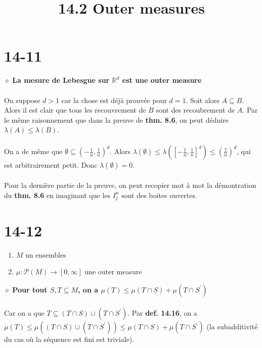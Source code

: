 \documentclass[a4paper,10pt]{article}
\title{14.2 Outer measures}
\begin{document}
\maketitle

\section*{14-11}
$\diamond$ \textbf{La mesure de Lebesgue sur $\mathbb{R}^d$ est une outer measure}
\\
\\
On suppose $d > 1$ car la chose est déjà prouvée pour $d = 1$. Soit alors $A \subseteq B$. Alors il est clair que tous les recouvrement de $B$ sont des recoubrement de $A$. Par le même raisonnement que dans la preuve de \textbf{thm. 8.6}, on peut déduire $\lambda (A) \leq \lambda (B)$.
\\
\\
On a de même que $\emptyset \subseteq (-\frac{1}{n}, \frac{1}{n})^d$. Alors $\lambda (\emptyset) \leq \lambda ([-\frac{1}{n}, \frac{1}{n}]^d)\leq (\frac{2}{n})^d$, qui est arbitrairement petit. Donc $\lambda(\emptyset) = 0$.
\\
\\
Pour la dernière partie de la preuve, on peut recopier mot à mot la démontration du \textbf{thm. 8.6} en imaginant que les $I_j^n$ sont des boites ouvertes.

\section*{14-12}
\begin{enumerate}
	\item $M$ un ensembles
	\item $\mu : \mathcal{P} (M) \rightarrow [0, \infty]$ une outer measure
\end{enumerate}
$\diamond$ \textbf{Pour tout $S,T \subseteq M$, on a $\mu (T) \leq \mu(T \cap S) + \mu (T \cap S^\prime)$}
\\
\\
Car on a que $T \subseteq (T \cap S) \cup (T\cap S^\prime)$. Par \textbf{def. 14.16}, on a $\mu (T) \leq \mu((T\cap S ) \cup (T \cap S^\prime)) \leq \mu(T \cap S) + \mu (T \cap S^\prime)$ (la subadditivité du cas où la séquence est fini est triviale).
\end{document}
